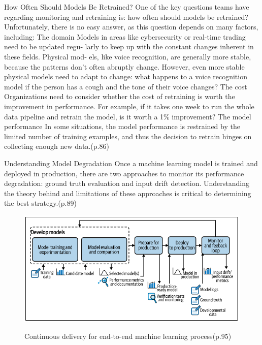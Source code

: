 How Often Should Models Be Retrained?
One of the key questions teams have regarding monitoring and retraining is: how
often should models be retrained? Unfortunately, there is no easy answer, as this
question depends on many factors, including:
The domain
Models in areas like cybersecurity or real-time trading need to be updated regu‐
larly to keep up with the constant changes inherent in these fields. Physical mod‐
els, like voice recognition, are generally more stable, because the patterns don’t
often abruptly change. However, even more stable physical models need to adapt
to change: what happens to a voice recognition model if the person has a cough
and the tone of their voice changes?
The cost
Organizations need to consider whether the cost of retraining is worth the
improvement in performance. For example, if it takes one week to run the whole
data pipeline and retrain the model, is it worth a 1\% improvement?
The model performance
In some situations, the model performance is restrained by the limited number of
training examples, and thus the decision to retrain hinges on collecting enough
new data.\cite{treveil2020introducing}(p.86)

Understanding Model Degradation
Once a machine learning model is trained and deployed in production, there are two
approaches to monitor its performance degradation: ground truth evaluation and
input drift detection. Understanding the theory behind and limitations of these
approaches is critical to determining the best strategy.\cite{treveil2020introducing}(p.89)

\begin{figure}[!htbp]
    \caption{Continuous delivery for end-to-end machine learning process\cite{treveil2020introducing}(p.95)}
    \centering
    \includegraphics[scale=0.5]{images/feedback-loop-intro}
    \label{fig:feedback-loop-intro}
\end{figure}


